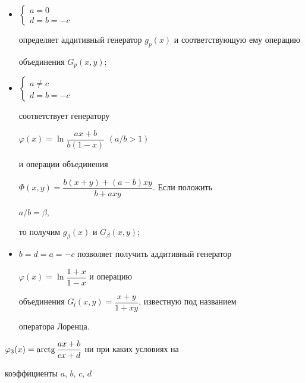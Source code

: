 \begin{itemize}


\item[i)]


$


\begin{cases}


a=0\\


d=b=-c


\end{cases}


$


определяет аддитивный генератор $g_p(x)$ и соответствующую ему операцию


объединения $G_p(x,y)$;\\


\item[ii)]


$


\begin{cases}


a\ne c\\


d=b=-c


\end{cases}


$


соответствует генератору


$\varphi(x)=\ln\dfrac{ax+b}{b(1-x)}$ $(a/b>1)$


и операции объединения


$\Phi(x,y)=\dfrac{b(x+y)+(a-b)xy}{b+axy}$. Если положить


$a/b=\beta$,


то получим $g_\beta(x)$ и $G_\beta(x,y)$;\\


\item[iii)]


$b=d=a=-c$ позволяет получить аддитивный генератор


$\varphi(x)=\ln\dfrac{1+x}{1-x}$ и операцию


объединения $G_l(x,y)=\dfrac{x+y}{1+xy}$, известную под названием


оператора Лоренца.


\end{itemize}





$\varphi_3(x)=\operatorname{arctg}\dfrac{ax+b}{cx+d}$ ни при каких условиях на


коэффициенты $a$, $b$, $c$, $d$


